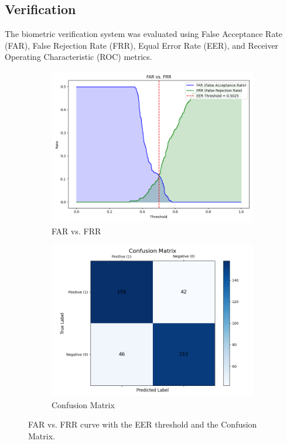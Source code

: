 \subsection{Verification}

The biometric verification system was evaluated using False Acceptance Rate (FAR), False Rejection Rate (FRR), Equal Error Rate (EER), and Receiver Operating Characteristic (ROC) metrics.

\begin{figure}[!ht]
    \centering
    \begin{subfigure}[t]{0.48\columnwidth}
        \includegraphics[width=\textwidth]{./images/plots/ver/far_vs_frr.png}
        \caption{FAR vs. FRR}
        \label{fig:far_vs_frr}
    \end{subfigure}
    \hfill
    \begin{subfigure}[t]{0.48\columnwidth}
        \includegraphics[width=\textwidth]{./images/plots/ver/confusion_matrix.png}
        \caption{Confusion Matrix}
        \label{fig:confusion_matrix}
    \end{subfigure}
    \caption{FAR vs. FRR curve with the EER threshold and the Confusion Matrix.}
    \label{fig:far_frr_confusion}
\end{figure}

